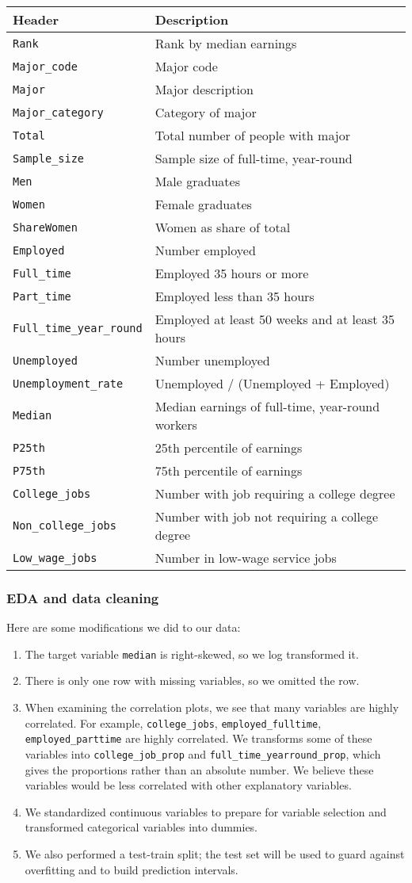 \documentclass[
]{article}
\begin{document}
\begin{longtable}[]{@{}ll@{}}
\toprule
Header & Description\tabularnewline
\midrule
\endhead
\texttt{Rank} & Rank by median earnings\tabularnewline
\texttt{Major\_code} & Major code\tabularnewline
\texttt{Major} & Major description\tabularnewline
\texttt{Major\_category} & Category of major\tabularnewline
\texttt{Total} & Total number of people with major\tabularnewline
\texttt{Sample\_size} & Sample size of full-time,
year-round\tabularnewline
\texttt{Men} & Male graduates\tabularnewline
\texttt{Women} & Female graduates\tabularnewline
\texttt{ShareWomen} & Women as share of total\tabularnewline
\texttt{Employed} & Number employed\tabularnewline
\texttt{Full\_time} & Employed 35 hours or more\tabularnewline
\texttt{Part\_time} & Employed less than 35 hours\tabularnewline
\texttt{Full\_time\_year\_round} & Employed at least 50 weeks and at
least 35 hours\tabularnewline
\texttt{Unemployed} & Number unemployed\tabularnewline
\texttt{Unemployment\_rate} & Unemployed / (Unemployed +
Employed)\tabularnewline
\texttt{Median} & Median earnings of full-time, year-round
workers\tabularnewline
\texttt{P25th} & 25th percentile of earnings\tabularnewline
\texttt{P75th} & 75th percentile of earnings\tabularnewline
\texttt{College\_jobs} & Number with job requiring a college
degree\tabularnewline
\texttt{Non\_college\_jobs} & Number with job not requiring a college
degree\tabularnewline
\texttt{Low\_wage\_jobs} & Number in low-wage service
jobs\tabularnewline
\bottomrule
\end{longtable}

\hypertarget{eda-and-data-cleaning}{%
\subsubsection{EDA and data cleaning}\label{eda-and-data-cleaning}}

Here are some modifications we did to our data:

\begin{enumerate}
\def\labelenumi{\arabic{enumi}.}
\item
  The target variable \texttt{median} is right-skewed, so we log
  transformed it.
\item
  There is only one row with missing variables, so we omitted the row.
\item
  When examining the correlation plots, we see that many variables are
  highly correlated. For example, \texttt{college\_jobs},
  \texttt{employed\_fulltime}, \texttt{employed\_parttime} are highly
  correlated. We transforms some of these variables into
  \texttt{college\_job\_prop} and \texttt{full\_time\_yearround\_prop},
  which gives the proportions rather than an absolute number. We believe
  these variables would be less correlated with other explanatory
  variables.
\item
  We standardized continuous variables to prepare for variable selection
  and transformed categorical variables into dummies.
\item
  We also performed a test-train split; the test set will be used to
  guard against overfitting and to build prediction intervals.
\end{enumerate}
\end{document}
